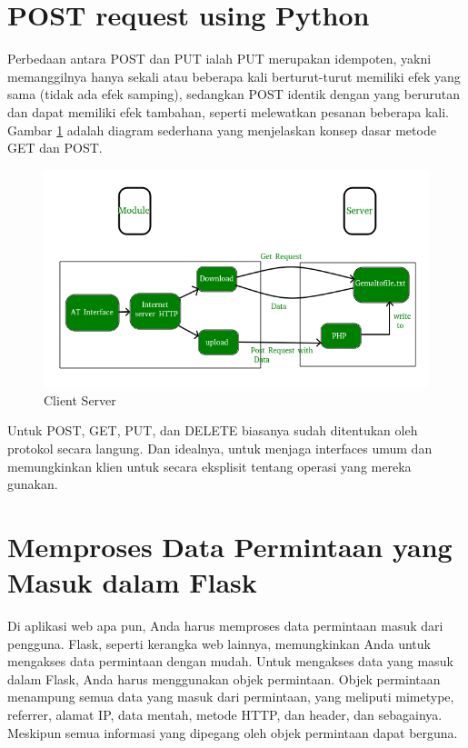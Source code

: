 \section{POST request using Python}
Perbedaan antara POST dan PUT ialah PUT merupakan idempoten, yakni memanggilnya hanya sekali atau beberapa kali berturut-turut memiliki efek yang sama (tidak ada efek samping), sedangkan POST identik dengan yang berurutan dan dapat memiliki efek tambahan, seperti melewatkan pesanan beberapa kali. Gambar \ref{3post} adalah diagram sederhana yang menjelaskan konsep dasar metode GET dan POST.

\begin{figure}[ht]
\centerline{\includegraphics[width=1\textwidth]{figures/3post.png}}
\caption{Client Server}
\label{3post}
\end{figure}

Untuk POST, GET, PUT, dan DELETE biasanya sudah ditentukan oleh protokol secara langung. Dan idealnya, untuk menjaga interfaces umum dan memungkinkan klien untuk secara eksplisit tentang operasi yang mereka gunakan\cite{rodriguez2008restful}.

\section{Memproses Data Permintaan yang Masuk dalam Flask}
Di aplikasi web apa pun, Anda harus memproses data permintaan masuk dari pengguna. Flask, seperti kerangka web lainnya, memungkinkan Anda untuk mengakses data permintaan dengan mudah. Untuk mengakses data yang masuk dalam Flask, Anda harus menggunakan objek permintaan. Objek permintaan menampung semua data yang masuk dari permintaan, yang meliputi mimetype, referrer, alamat IP, data mentah, metode HTTP, dan header, dan sebagainya. Meskipun semua informasi yang dipegang oleh objek permintaan dapat berguna\cite{walsh2007application}.

